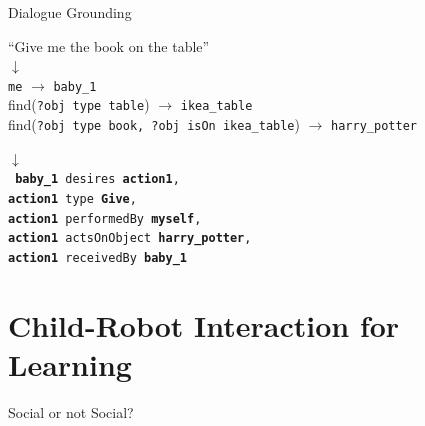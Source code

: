 \documentclass[handout,compress]{beamer}
\begin{document}
{


\begin{frame}{Dialogue Grounding}
    \centering

    \vspace*{2em}
    ``Give me the book on the table''\\

     {
        $\downarrow$\\
    {\tt me} $\rightarrow$ {\tt baby\_1} \\
    find({\tt\scriptsize ?obj type table}) $\rightarrow$ {\tt ikea\_table} \\
    find({\tt\scriptsize ?obj type book, ?obj isOn ikea\_table}) $\rightarrow$ {\tt harry\_potter} \\
}

     {
        $\downarrow$\\
        { \tt
            \textbf{baby\_1} desires \textbf{action1}, \\
            \textbf{action1} type \textbf{Give}, \\
            \textbf{action1} performedBy \textbf{myself}, \\
            \textbf{action1} actsOnObject \textbf{harry\_potter}, \\
            \textbf{action1} receivedBy \textbf{baby\_1} \\
        }
    }
\end{frame}
}


 \section[CRI for Learning]{Child-Robot Interaction for Learning}


 \begin{frame}{Social or not Social?}
     \begin{center}
     \end{center}
 \end{frame}
\end{document}

